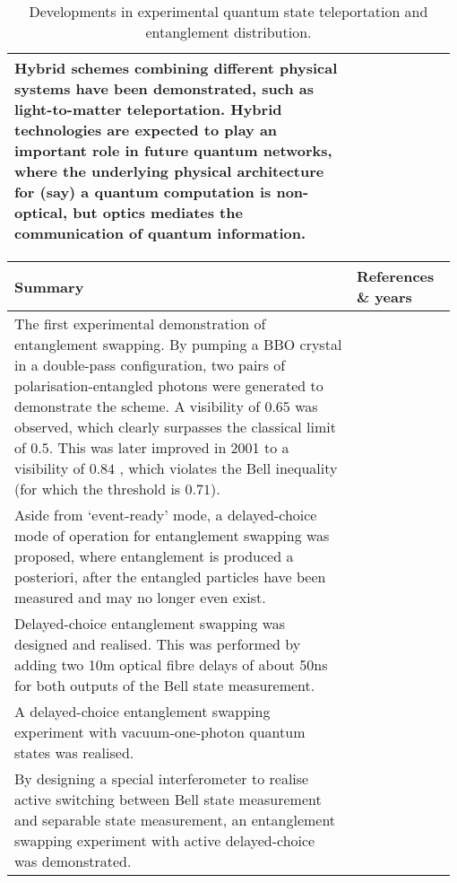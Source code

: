 \begin{table*}[!htbp]
\begin{tabular}{|p{0.755\linewidth}|p{0.22\linewidth}|}
	\hline
Hybrid schemes combining different physical systems have been demonstrated, such as light-to-matter teleportation. Hybrid technologies are expected to play an important role in future quantum networks, where the underlying physical architecture for (say) a quantum computation is non-optical, but optics mediates the communication of quantum information. & \cite{bib:Nat_443_557, bib:Nat_Comm_4_2744} \\
	\hline
\end{tabular}
\captionspacetab \caption{Developments in experimental quantum state teleportation and entanglement distribution.} \label{tab:state_tomo}
\end{table*}

\begin{table*}[!htbp]
	\begin{tabular}{|p{0.755\linewidth}|p{0.22\linewidth}|}
		\hline
		Summary & References \& years \\
		\hline \hline
		The first experimental demonstration of entanglement swapping. By pumping a BBO crystal in a double-pass configuration, two pairs of polarisation-entangled photons were generated to demonstrate the scheme. A visibility of \mbox{$0.65$} was observed, which clearly surpasses the classical limit of \mbox{$0.5$}. This was later improved in 2001 to a visibility of \mbox{$0.84$} , which violates the Bell inequality (for which the threshold is $0.71$).  & \cite{bib:PRL_80_3891, bib:jennewein2001experimental} \\
		\hline
		Aside from `event-ready' mode, a delayed-choice mode of operation for entanglement swapping was proposed, where entanglement is produced a posteriori, after the entangled particles have been measured and may no longer even exist.& \cite{bib:peres2000delayed}\\
		\hline
		Delayed-choice entanglement swapping was designed and realised. This was performed by adding two 10m optical fibre delays of about 50ns for both outputs of the Bell state measurement. & \cite{bib:PRL_88_017903}\\
		\hline
		A delayed-choice entanglement swapping experiment with vacuum-one-photon quantum states was realised. 
		& \cite{bib:PRA_66_024309}\\
		\hline
		By designing a special interferometer to realise active switching between Bell state measurement and separable state measurement, an entanglement swapping experiment with active delayed-choice was demonstrated. 

\end{tabular}
\end{table*}
